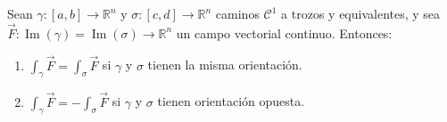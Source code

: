 \begin{teorema}
    Sean $\gamma : [a, b] \to \mathbb{R}^n$ y $\sigma : [c, d] \to \mathbb{R}^n$ caminos $\mathcal{C}^1$ a trozos y equivalentes, y sea $\vec{F} : \operatorname{Im}(\gamma) = \operatorname{Im}(\sigma) \to \mathbb{R}^n$ un campo vectorial continuo. Entonces:
    \vspace{-0.5em}
    \begin{enumerate}
        \item $\displaystyle \int_\gamma \vec{F} = \int_\sigma \vec{F}$ \quad si $\gamma$ y $\sigma$ tienen la misma orientación.
        \item $\displaystyle \int_\gamma \vec{F} = - \int_\sigma \vec{F}$ \quad si $\gamma$ y $\sigma$ tienen orientación opuesta.
    \end{enumerate}
\end{teorema}

